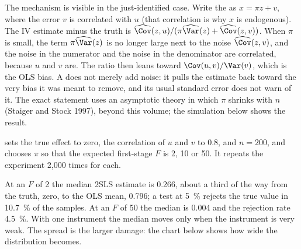 The mechanism is visible in the just-identified case. Write the  as
$x = \pi z + v$, where the error $v$ is correlated with $u$ (that correlation
is why $x$ is endogenous). The IV estimate minus the truth is
$\widehat{\Cov}(z, u) / (\pi \widehat{\Var}(z) + \widehat{\Cov}(z, v))$. When
$\pi$ is small, the term $\pi\widehat{\Var}(z)$ is no longer large next to the
noise $\widehat{\Cov}(z, v)$, and the noise in the numerator and the noise in
the denominator are correlated, because $u$ and $v$ are. The ratio then leans
toward $\Cov(u, v)/\Var(v)$, which is the OLS bias. A  does not
merely add noise: it pulls the estimate back toward the very bias it was meant
to remove, and its usual standard error does not warn of it.
\admitted
The exact statement uses an asymptotic theory in which $\pi$ shrinks with $n$
(Staiger and Stock 1997), beyond this volume; the simulation below shows the
result.

 sets the true effect to zero, the
correlation of $u$ and $v$ to 0.8, and $n = 200$, and chooses $\pi$ so that the
expected first-stage $F$ is 2, 10 or 50. It repeats the experiment 2{,}000
times for each.

\label{lst:b3:instrumental-variables:weak}

\label{out:b3:instrumental-variables:weak}

At an $F$ of 2 the median 2SLS estimate is 0.266, about a third of the way
from the truth, zero, to the OLS mean, 0.796; a test at 5~\% rejects the true
value in 10.7~\% of the samples. At an $F$ of 50 the median is 0.004 and the
rejection rate 4.5~\%. %
With one instrument the median moves only when the instrument is very weak.
The spread is the larger damage: the chart below shows how wide the
distribution becomes.


